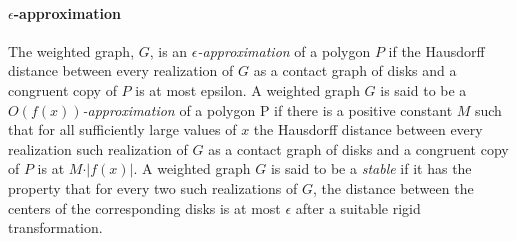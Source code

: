 \documentclass[10pt]{CSUNthesis}
\theoremstyle{plain}%
\theoremstyle{definition}
\theoremstyle{remark}
\newcommand{\BigOh}[1]{O\left( #1 \right)}
\begin{document}
\paragraph{$\epsilon$-approximation}
The weighted graph, $G$, is an \textit{$\epsilon$-approximation} of a polygon $P$ if the Hausdorff distance between every realization of $G$ as a contact graph of disks and a congruent copy of $P$ is at most epsilon.  
A weighted graph $G$ is said to be a \textit{$\BigOh{f(x)}$-approximation} of a polygon P if there is a positive constant $M$ such that for all sufficiently large values of $x$ the Hausdorff distance between every realization such realization of $G$ as a contact graph of disks and a congruent copy of $P$ is at $M \cdot \vert f(x)\vert$. 
A weighted graph $G$ is said to be a \textit{stable} if it has the property that for every two such realizations of $G$, the distance between the centers of the corresponding disks is at most $\epsilon$ after a suitable rigid transformation.
\end{document}
